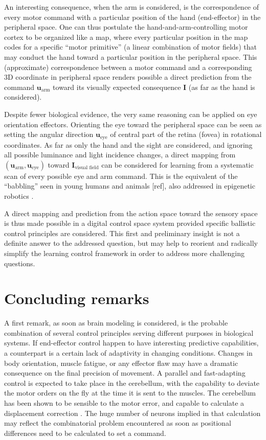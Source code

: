 \documentclass[11pt]{article}
\begin{document}
 
An interesting consequence, when the arm is considered, is the correspondence of every motor command with a particular position of the hand (end-effector) in the peripheral space. 
One can thus postulate the hand-and-arm-controlling motor cortex to be organized like a map, where every particular position in the map codes for a specific ``motor primitive'' (a linear combination of motor fields) that may conduct the hand toward a particular position in the peripheral space.
This (approximate) correspondence between a  motor command and a corresponding 3D coordinate in peripheral space renders  possible a direct prediction from the command $\boldsymbol{u}_\text{arm}$ toward its visually expected consequence $\boldsymbol{I}$ (as far as the hand is considered).

Despite fewer biological evidence, the very same reasoning can be applied on eye orientation effectors.  Orienting the eye toward the peripheral space can be seen as setting the angular direction $\boldsymbol{u}_\text{eye}$ of central part of the retina (fovea) in rotational coordinates.
As far as only the hand and the sight are considered, and ignoring all possible luminance and light incidence changes, a direct mapping from $(\boldsymbol{u}_\text{arm}, 
	\boldsymbol{u}_\text{eye})$ toward $\boldsymbol{I}_\text{visual field}$ can be considered for learning from a systematic scan of every possible eye and arm command. This is the equivalent of the ``babbling'' seen in young humans and animals [ref], also addressed in epigenetic robotics . 

A direct mapping and prediction from the action space toward the sensory space is thus made possible in a digital control space system provided specific ballistic control principles are considered. This first and preliminary insight is not a definite answer to the addressed question, but may help to reorient and radically simplify the learning control framework in order to address more challenging questions. 

\section{Concluding remarks}

A first remark, as soon as  brain modeling is considered, is the probable combination of several control principles serving different purposes in biological systems. 
If end-effector control happen to have interesting predictive capabilities, a counterpart is a certain lack of adaptivity in changing conditions.  Changes in body orientation, muscle fatigue, or any effector flaw may have a dramatic consequence on the final precision of movement. A parallel and fast-adapting control is expected to take place in the cerebellum, with the capability to deviate the motor orders on the fly at the time it is sent to the muscles.  The cerebellum has been shown to be sensible to the motor error, and capable to calculate a displacement correction . The huge number of neurons implied in that calculation may reflect the combinatorial problem encountered as soon as positional differences need to be calculated to set a command. 
 
\end{document}
